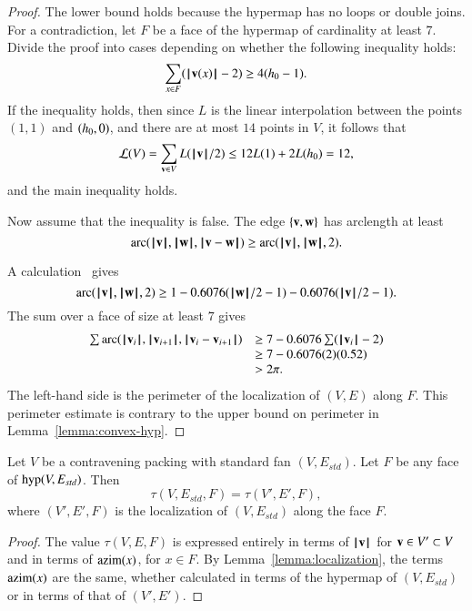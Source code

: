 \begin{proof} The lower bound holds because the hypermap has no loops or double joins.  For a contradiction, let $F$ be a face of the hypermap of cardinality at least $7$.  Divide the proof into cases depending on whether the
following inequality holds:
$$
\sum _{x\in F} (\normo{\v(x)}-2) \ge 4(\hm-1).
$$
If the inequality holds, then since $L$ is the linear interpolation between the points $(1,1)$ and $(\hm,0)$, and there are at most $14$ points in $V$, it follows that
$$\CalL(V) = \sum_{\v\in V}L(\normo{\v}/2) \le 12 L(1) + 2 L(\hm) =12,$$
and the main inequality holds.

Now assume that the inequality is false.
The edge $\{\v,\w\}$ has arclength at least
$$
\arc(\normo{\v},\normo{\w},\norm{\v}{\w}) \ge \arc(\normo{\v},\normo{\w},2). 
$$

A calculation~\cite[cc:arc]{hales:2009:nonlinear} gives
$$\arc(\normo{\v},\normo{\w},2)\ge 1 - 0.6076 (\normo{\w}/2 - 1) - 0.6076 (\normo{\v}/2 - 1).$$ %
The sum over a face of size at least $7$ gives
$$
\begin{array}{lll}
\sum \arc(\normo{\v_i},\normo{\v_{i+1}},\norm{\v_i}{\v_{i+1}})&\ge
7 - 0.6076 \sum (\normo{\v_i}-2) \\
   &\ge 7 - 0.6076 (2) (0.52) \\
   &> 2\pi.
\end{array}
$$
The left-hand side is the perimeter of the localization of $(V,E)$ along $F$.
This perimeter estimate is contrary to the upper bound on perimeter in Lemma~\ref{lemma:convex-hyp}.
\end{proof}

\begin{lemma}  \label{lemma:tau-local}
Let $V$ be a contravening packing with
standard fan $(V,E_{std})$.  Let $F$ be any face of $\op{hyp}(V,E_{std})$.  Then
$$
\tau(V,E_{std},F) = \tau(V',E',F),
$$
where $(V',E',F)$ is the localization of $(V,E_{std})$ along the face $F$.
\end{lemma}

\begin{proof}  The value $\tau(V,E,F)$ is expressed entirely in terms of $\normo{\v}$ for $\v\in V'\subset V$ and in terms of $\op{azim}(x)$, for $x\in F$.  By Lemma~\ref{lemma:localization}, the terms $\op{azim}(x)$ are the same, whether calculated in terms of the hypermap of $(V,E_{std})$ or in terms of that of $(V',E')$. 
\end{proof}



